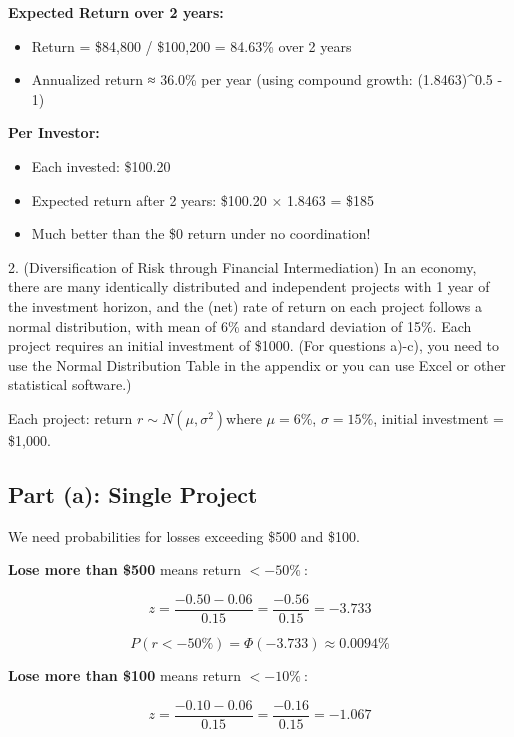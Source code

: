 \documentclass[a4paper]{article}
\begin{document}
\textbf{Expected Return over 2 years:}

\begin{itemize}
\item
  Return = \$84,800 / \$100,200 = 84.63\% over 2 years
\item
  Annualized return ≈ 36.0\% per year (using compound growth:
  (1.8463)\^{}0.5 - 1)
\end{itemize}

\textbf{Per Investor:}

\begin{itemize}
\item
  Each invested: \$100.20
\item
  Expected return after 2 years: \$100.20 × 1.8463 = \$185
\item
  Much better than the \$0 return under no coordination!
\end{itemize}

2. (Diversification of Risk through Financial Intermediation) In an
economy, there are many identically distributed and independent projects
with 1 year of the investment horizon, and the (net) rate of return on
each project follows a normal distribution, with mean of 6\% and
standard deviation of 15\%. Each project requires an initial investment
of \$1000. (For questions a)-c), you need to use the Normal Distribution
Table in the appendix or you can use Excel or other statistical
software.)

Each project: return \(r \sim N(\mu,\sigma^{2})\)where \(\mu = 6\%\),
\(\sigma = 15\%\), initial investment = \$1,000.

\hypertarget{part-a-single-project}{%
\subsection{Part (a): Single Project}\label{part-a-single-project}}

We need probabilities for losses exceeding \$500 and \$100.

\textbf{Lose more than \$500} means return \(\left. <-50\% \right.\ \):

\[z = \frac{- 0.50 - 0.06}{0.15} = \frac{- 0.56}{0.15} = - 3.733\]

\[P(r < - 50\%) = \Phi( - 3.733) \approx \mathbf{0.0094\%}\]

\textbf{Lose more than \$100} means return \(\left. <-10\% \right.\ \):

\[z = \frac{- 0.10 - 0.06}{0.15} = \frac{- 0.16}{0.15} = - 1.067\]
\end{document}
